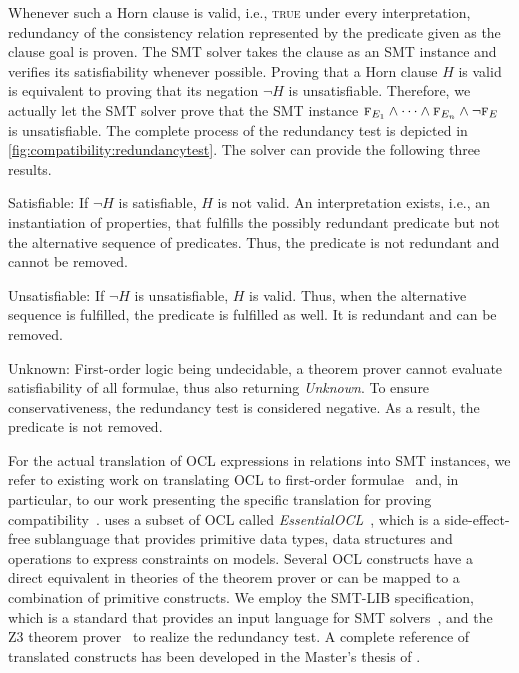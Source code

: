 Whenever such a Horn clause is valid, i.e., \textsc{true} under every interpretation, redundancy of the consistency relation represented by the predicate given as the clause goal is proven.
The \gls{SMT} solver takes the clause as an \gls{SMT} instance and verifies its satisfiability whenever possible.
Proving that a Horn clause $H$ is valid is equivalent to proving that its negation $\neg H$ is unsatisfiable.
Therefore, we actually let the \gls{SMT} solver prove that the \gls{SMT} instance $\textsc{f}_{E_1} \wedge \dots \wedge \textsc{f}_{E_n} \wedge \neg \textsc{f}_{E}$ is unsatisfiable.
The complete process of the redundancy test is depicted in \autoref{fig:compatibility:redundancytest}.
The solver can provide the following three results.
\begin{properdescription}
    \item[Satisfiable:] If $\neg H$ is satisfiable, $H$ is not valid. An interpretation exists, i.e., an instantiation of properties, that fulfills the possibly redundant predicate but not the alternative sequence of predicates. Thus, the predicate is not redundant and cannot be removed.
    \item[Unsatisfiable:] If $\neg H$ is unsatisfiable, $H$ is valid. Thus, when the alternative sequence is fulfilled, the predicate is fulfilled as well. It is redundant and can be removed.
    \item[Unknown:] First-order logic being undecidable, a theorem prover cannot evaluate satisfiability of all formulae, thus also returning \emph{Unknown}. To ensure conservativeness, the redundancy test is considered negative. As a result, the predicate is not removed.
\end{properdescription}

For the actual translation of \gls{OCL} expressions in \qvtr relations into \gls{SMT} instances, we refer to existing work on translating \gls{OCL} to first-order formulae~\cite{beckert2002ocltranslation} and, in particular, to our work presenting the specific translation for proving compatibility~.
\qvtr uses a subset of \gls{OCL} called \emph{EssentialOCL}~\cite{qvt}, which is a side-effect-free sublanguage that provides primitive data types, data structures and operations to express constraints on models.
Several \gls{OCL} constructs have a direct equivalent in theories of the theorem prover or can be mapped to a combination of primitive constructs.
We employ the SMT-LIB specification, which is a standard that provides an input language for \gls{SMT} solvers~\cite{smtlib2017}, and the Z3 theorem prover~\cite{z32008} to realize the redundancy test.
A complete reference of translated constructs has been developed in the Master's thesis of .

